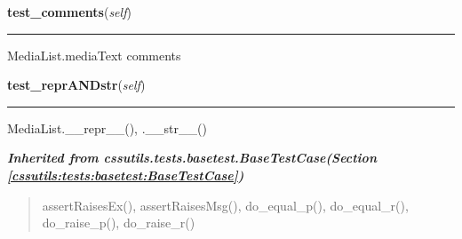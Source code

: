     \label{cssutils:tests:test_medialist:MediaListTestCase:test_comments}

    \vspace{0.5ex}

\hspace{.8\funcindent}\begin{boxedminipage}{\funcwidth}

    \raggedright \textbf{test\_comments}(\textit{self})

    \vspace{-1.5ex}

    \rule{\textwidth}{0.5\fboxrule}
\setlength{\parskip}{2ex}
    MediaList.mediaText comments

\setlength{\parskip}{1ex}
    \end{boxedminipage}

    \label{cssutils:tests:test_medialist:MediaListTestCase:test_reprANDstr}

    \vspace{0.5ex}

\hspace{.8\funcindent}\begin{boxedminipage}{\funcwidth}

    \raggedright \textbf{test\_reprANDstr}(\textit{self})

    \vspace{-1.5ex}

    \rule{\textwidth}{0.5\fboxrule}
\setlength{\parskip}{2ex}
    MediaList.\_\_repr\_\_(), .\_\_str\_\_()

\setlength{\parskip}{1ex}
    \end{boxedminipage}


\large{\textbf{\textit{Inherited from cssutils.tests.basetest.BaseTestCase\textit{(Section \ref{cssutils:tests:basetest:BaseTestCase})}}}}

\begin{quote}
assertRaisesEx(), assertRaisesMsg(), do\_equal\_p(), do\_equal\_r(), do\_raise\_p(), do\_raise\_r()
\end{quote}

